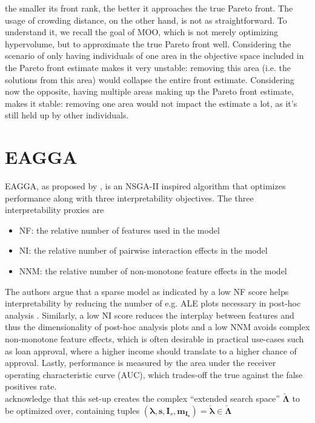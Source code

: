 \documentclass[twoside,11pt]{article}
\begin{document}
the smaller its front rank, the better it approaches the true Pareto front.
The usage of crowding distance, on the other hand, is not as straightforward. To understand it, we recall the goal of MOO, which is not merely optimizing
hypervolume, but to approximate the true Pareto front well.
Considering the scenario of only having individuals of one area in the objective space included in the Pareto front estimate makes it very unstable: removing this
area (i.e. the solutions from this area) would collapse the entire front estimate.
Considering now the opposite, having multiple areas making up the Pareto front estimate, makes it stable: removing one area would not impact the estimate a lot,
as it's still held up by other individuals. \citep[p. 185, pp. 189-192]{genetic_algos}


\section{EAGGA}
EAGGA, as proposed by \citet{EAGGA}, is an NSGA-II inspired algorithm that optimizes performance along with three interpretability objectives.
The three interpretability proxies are
\begin{itemize}
  \item NF: the relative number of features used in the model
  \item NI: the relative number of pairwise interaction effects in the model
  \item NNM: the relative number of non-monotone feature effects in the model
\end{itemize}
The authors argue that a sparse model as indicated by a low NF score helps interpretability by reducing the number of e.g. ALE plots necessary in post-hoc
analysis \citep[p. 540]{EAGGA}. Similarly, a low NI score reduces the interplay between features and thus the dimensionality of post-hoc analysis plots
and a low NNM avoids complex non-monotone feature effects, which is often desirable in practical use-cases such as loan approval, where a higher income should
translate to a higher chance of approval.
Lastly, performance is measured by the area under the receiver operating characteristic curve (AUC), which trades-off the true against the false positives rate.
\\
\citet[pp. 540f]{EAGGA} acknowledge that this set-up creates the complex ``extended search space'' $\check{\boldsymbol\Lambda}$ to be optimized over, containing
tuples $(\boldsymbol\lambda, \boldsymbol{s}, \boldsymbol{I}_s, \boldsymbol{m}_{\boldsymbol{I}_{\boldsymbol{s}}})=\check{\boldsymbol\lambda}\in\check{\boldsymbol\Lambda}$
\end{document}
